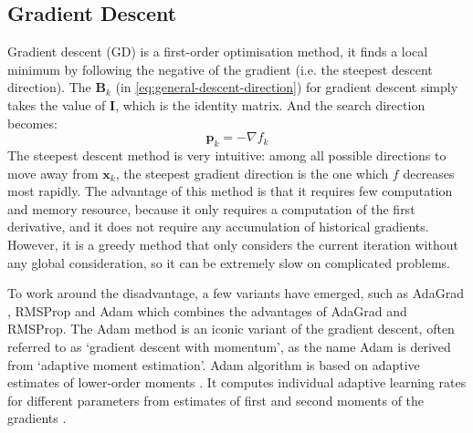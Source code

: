 \subsection{Gradient Descent}\label{sec:GD}
Gradient descent (GD) is a first-order optimisation method, it finds a local minimum by following the negative of the gradient (i.e. the steepest descent direction). The $\textbf{B}_k$ (in \cref{eq:general-descent-direction}) for gradient descent simply takes the value of $\textbf{I}$, which is the identity matrix. And the search direction becomes:
\begin{equation}
  \textbf{p}_k = -\nabla f_k
\end{equation}
The steepest descent method is very intuitive: among all possible directions to move away from $\textbf{x}_{k}$, the steepest gradient direction is the one which $f$ decreases most rapidly. The advantage of this method is that it requires few computation and memory resource, because it only requires a computation of the first derivative, and it does not require any accumulation of historical gradients. However, it is a greedy method that only considers the current iteration without any global consideration, so it can be extremely slow on complicated problems. \cite{Nocedal2006}

To work around the disadvantage, a few variants have emerged, such as AdaGrad \cite{Duchi2011}, RMSProp \cite{Tieleman2012} and Adam \cite{Kingma2015} which combines the advantages of AdaGrad and RMSProp. The Adam method is an iconic variant of the gradient descent, often referred to as `gradient descent with momentum', as the name Adam is derived from `adaptive moment estimation'. Adam algorithm is based on adaptive estimates of lower-order moments \cite{Kingma2015}. It computes individual adaptive learning rates for different parameters from estimates of first and second moments of the gradients \cite{Kingma2015}.


